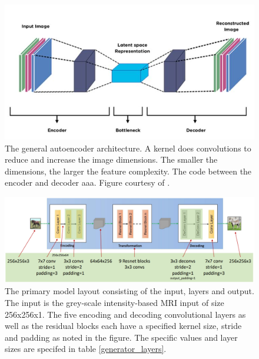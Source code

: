 \documentclass[12pt, fleqn, titlepage]{article}
\begin{document}
\begin{figure}[H]
	\centering
	\includegraphics[width=0.7\linewidth]{imgs/autoencoder}
	\caption{The general autoencoder architecture. A kernel does convolutions to reduce and increase the image dimensions. The smaller the dimensions, the larger the feature complexity. The code between the encoder and decoder aaa. Figure courtesy of \cite{autoencoder}.} %
	\label{fig:autoencoder}
\end{figure}


\begin{figure}[H]
	\centering
	\includegraphics[width=0.7\linewidth]{imgs/cyclegan_generator_layers}
	\caption{The primary model layout consisting of the input, layers and output. The input is the grey-scale intensity-based MRI input of size 256x256x1. The five encoding and decoding convolutional layers as well as the residual blocks each have a specified kernel size, stride and padding as noted in the figure. The specific values and layer sizes are specifed in table \ref{generator_layers}.} %
	\label{fig:cyclegangeneratorlayers}
\end{figure}
\end{document}
